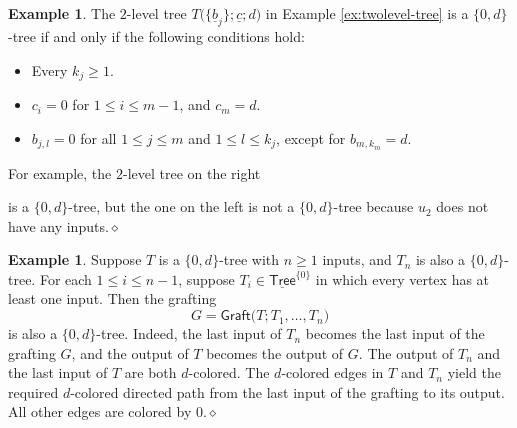 \documentclass[11pt]{amsbook}
\numberwithin{section}{chapter}
\numberwithin{subsection}{section}
\numberwithin{equation}{section}
\theoremstyle{plain}
\theoremstyle{definition}
\newtheorem{example}[equation]{Example}
\newcommand{\graft}{\mathsf{Graft}}
\newcommand{\zerod}{\{0,d\}}
\newcommand{\dqed}{\hfill$\diamond$}
\newcommand{\Tree}{\mathsf{Tree}}
\newcommand{\uTree}{\underline{\Tree}}
\newcommand{\uTreezero}{\uTree^{\{0\}}}
\newcommand{\ub}{\underline b}
\newcommand{\uc}{\underline c}
\begin{document}
\begin{example} The $2$-level tree $T\bigl(\{\ub_j\};\uc;d\bigr)$ in Example \ref{ex:twolevel-tree} is a $\zerod$-tree if and only if the following conditions hold:
\begin{itemize}
\item Every $k_j \geq 1$.
\item $c_i=0$ for $1 \leq i \leq m-1$, and $c_m=d$.
\item $b_{j,l}=0$ for all $1 \leq j \leq m$ and $1 \leq l \leq k_j$, except for $b_{m,k_m}=d$.
\end{itemize}
For example, the $2$-level tree on the right
\begin{center}\end{center}
is a $\zerod$-tree, but the one on the left is not a $\zerod$-tree because $u_2$ does not have any inputs.\dqed
\end{example}

\begin{example} Suppose $T$ is a $\zerod$-tree with $n \geq 1$ inputs, and $T_n$ is also a $\zerod$-tree.  For each $1 \leq i \leq n-1$, suppose $T_i \in \uTreezero$ in which every vertex has at least one input.  Then the grafting \[G=\graft\bigl(T;T_1,\ldots,T_n)\] is also a $\zerod$-tree.  Indeed, the last input of $T_n$ becomes the last input of the grafting $G$, and the output of $T$ becomes the output of $G$.  The output of $T_n$ and the last input of $T$ are both $d$-colored.  The $d$-colored edges in $T$ and $T_n$ yield the required $d$-colored directed path from the last input of the grafting to its output.  All other edges are colored by $0$.\dqed
\end{example}
\end{document}

